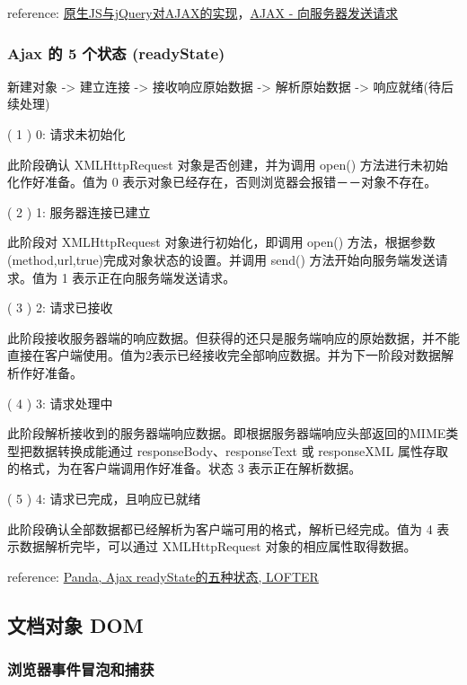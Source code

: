 reference: \href{http://segmentfault.com/a/1190000003096293}{原生JS与jQuery对AJAX的实现}，\href{http://www.w3school.com.cn/ajax/ajax\_xmlhttprequest\_send.asp}{AJAX - 向服务器发送请求}

\subsubsection{Ajax 的 5 个状态 (readyState)}\hypertarget{ajax--5--readystate}{}\label{ajax--5--readystate}

新建对象 -\textgreater{} 建立连接 -\textgreater{} 接收响应原始数据 -\textgreater{} 解析原始数据 -\textgreater{} 响应就绪(待后续处理)

( 1 ) 0: 请求未初始化

此阶段确认 XMLHttpRequest 对象是否创建，并为调用 open() 方法进行未初始化作好准备。值为 0 表示对象已经存在，否则浏览器会报错－－对象不存在。

( 2 ) 1: 服务器连接已建立

此阶段对 XMLHttpRequest 对象进行初始化，即调用 open() 方法，根据参数 (method,url,true)完成对象状态的设置。并调用 send() 方法开始向服务端发送请求。值为 1 表示正在向服务端发送请求。

( 3 ) 2: 请求已接收

此阶段接收服务器端的响应数据。但获得的还只是服务端响应的原始数据，并不能直接在客户端使用。值为2表示已经接收完全部响应数据。并为下一阶段对数据解析作好准备。

( 4 ) 3: 请求处理中

此阶段解析接收到的服务器端响应数据。即根据服务器端响应头部返回的MIME类型把数据转换成能通过 responseBody、responseText 或 responseXML 属性存取的格式，为在客户端调用作好准备。状态 3 表示正在解析数据。

( 5 ) 4: 请求已完成，且响应已就绪

此阶段确认全部数据都已经解析为客户端可用的格式，解析已经完成。值为 4 表示数据解析完毕，可以通过 XMLHttpRequest 对象的相应属性取得数据。

reference: \href{http://blog.163.com/freestyle\_le/blog/static/183279448201269112527311/}{Panda, Ajax readyState的五种状态, LOFTER}

\subsection{文档对象 DOM}\hypertarget{dom}{}\label{dom}

\subsubsection{浏览器事件冒泡和捕获}\hypertarget{section-8}{}\label{section-8}

